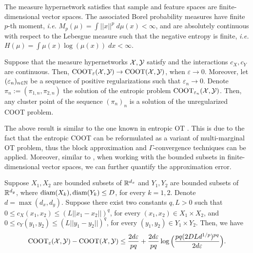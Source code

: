 \begin{assumption}
  \label{assump:ent_coot}
  The measure hypernetwork satisfies that sample and feature spaces are
  finite-dimensional vector spaces. The associated Borel probability measures
  have finite $p$-th moment, \textit{i.e.} $M_p(\mu) = \int ||x||^p \; d\mu(x) < \infty$, and are
  absolutely continuous with respect to the Lebesgue measure such that the negative entropy is finite,
  \textit{i.e.} $H(\mu) = \int \mu(x) \log(\mu(x)) \; dx < \infty$.
\end{assumption}
\begin{proposition} \label{conv_ent_coot}
  Suppose that the measure hypernetworks $\mathcal X, \mathcal Y$ satisfy  and
  the interactions $c_X, c_Y$ are continuous. Then, $\text{COOT}_{\varepsilon}(\mathcal X, \mathcal Y) \to \text{COOT}(\mathcal X, \mathcal Y)$,
  when $\varepsilon \to 0$. Moreover, let $(\varepsilon_n)_{n \in \mathbb N}$ be a sequence of
  positive regularizations such that $\varepsilon_n \to 0$.
  Denote $\pi_n := (\pi_{1, n}, \pi_{2, n})$ the solution of the entropic problem
  $\text{COOT}_{\varepsilon_n} (\mathcal X, \mathcal Y)$. Then, any cluster point of the sequence $(\pi_n)_n$ is
  a solution of the unregularized COOT problem.
\end{proposition}
The above result is similar to the one known in entropic OT \citep{Carlier17}. This is due to the fact
that the entropic COOT can be reformulated as a variant of multi-marginal OT problem,
thus the block approximation and $\Gamma$-convergence techniques can be applied. Moreover,
similar to \citep{Genevay19}, when working with the bounded subsets in finite-dimensional vector spaces,
we can further quantify the approximation error.
\begin{proposition} \label{prop:quant_bound_ent}
  Suppose $X_1, X_2$ are bounded subsets of $\mathbb R^{d_x}$ and
  $Y_1, Y_2$ are bounded subsets of $\mathbb R^{d_y}$,
  where $\text{diam}(X_k), \text{diam}(Y_k) \leq D$, for every $k=1,2$. Denote $d = \max(d_x, d_y)$.
  Suppose there exist two constants $q, L > 0$ such that
  $0 \leq c_X(x_1, x_2) \leq (L \vert\vert x_1 - x_2 \vert\vert)^q$,
  for every $(x_1,x_2) \in X_1 \times X_2$, and
  $0 \leq c_Y(y_1, y_2) \leq (L \vert\vert y_1 - y_2 \vert\vert)^q$,
  for every $(y_1,y_2) \in Y_1 \times Y_2$. Then, we have
  \begin{equation*}
    \text{COOT}_{\varepsilon}(\mathcal X, \mathcal Y) - \text{COOT}(\mathcal X, \mathcal Y) \leq \frac{2 d \varepsilon}{pq} +
    \frac{2d \varepsilon}{pq} \log\Big( \frac{pq (2DLd^{1/p})^{pq}}{2d \varepsilon} \Big).
  \end{equation*}
\end{proposition}
